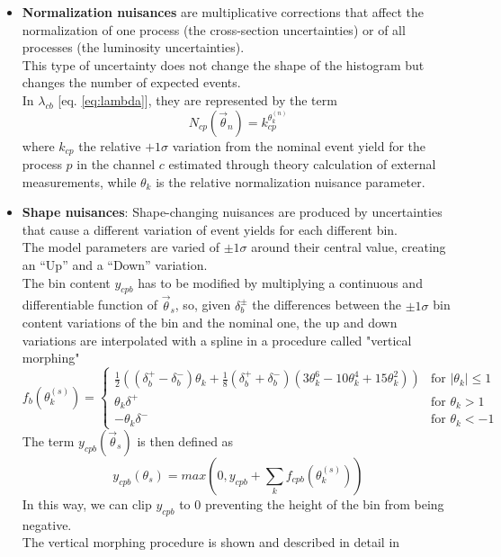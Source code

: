 \begin{itemize}
    \item \textbf{Normalization nuisances} are multiplicative corrections that affect the normalization of one process (\eg the cross-section uncertainties) or of all processes (\eg the luminosity uncertainties).\\
    This type of uncertainty does not change the shape of the histogram but changes the number of expected events.\\
    In $\lambda_{cb}$ [eq. \ref{eq:lambda}], they are represented by the term
    \begin{equation}
        N_{cp}\left(\vec{\theta}_n\right)=k_{cp}^{\theta^{(n)}_k}
    \end{equation}
    where $k_{cp}$ the relative $+1 \sigma$ variation from the nominal event yield for the process $p$ in the channel $c$ estimated through theory calculation of external measurements, while $\theta_{k}$ is the relative normalization nuisance parameter.\\
    \newpage
    \item \textbf{Shape nuisances}: Shape-changing nuisances are produced by uncertainties
    that cause a different variation of event yields for each different bin.\\
    The model parameters are varied of $\pm 1 \sigma$ around their central value, creating an “Up” and a “Down” variation.\\
    The bin content $y_{cpb}$ has to be modified by multiplying a continuous and differentiable function of $\vec{\theta}_{s}$, so, given $\delta_b^\pm$ the differences between the $\pm 1 \sigma$ bin content variations of the bin and the nominal one, the up and down variations are interpolated with a spline in a procedure called "vertical morphing" \cite{Conway2011IncorporatingSpectra}
    \begin{equation}
    f_b\left(\theta_k^{(s)}\right)=
        \begin{cases}
            {\frac{1}{2}}\left((\delta_b^{+}-\delta_b^{-})\theta_k+{\frac{1}{8}}(\delta_b^{+}+\delta_b^{-})(3\theta_k^{6}-10\theta_k^{4}+15\theta_k^{2})\right) & \text{for } |\theta_k|\leq 1\\
            \theta_k \delta^+ & \text{for } \theta_k>1\\
            -\theta_k \delta^{-} & \text{for } \theta_k<-1
        \end{cases}
    \end{equation}
    The term $y_{cpb}(\vec{\theta}_s)$ is then defined as 
    \begin{equation}
        y_{cpb}(\theta_s)=max\left(0,y_{cpb}+\sum_k f_{cpb}\left(\theta_k^{(s)} \right)\right)
    \end{equation}
    In this way, we can clip $y_{cpb}$ to 0 preventing the height of the bin from being negative.\\
    The vertical morphing procedure is shown and described in detail in 




\end{itemize}
